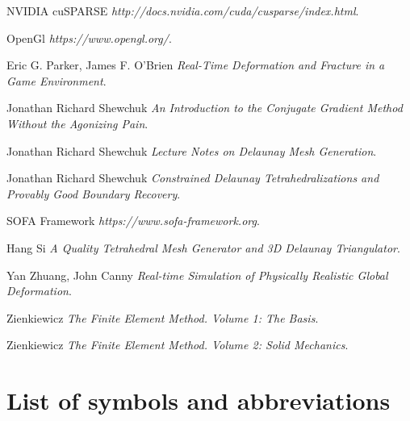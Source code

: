 \documentclass[en]{minipw} %
\begin{document}
\begin{thebibliography}{25}
 NVIDIA cuSPARSE \emph{http://docs.nvidia.com/cuda/cusparse/index.html}.

 OpenGl \emph{https://www.opengl.org/}.

 Eric G. Parker, James F. O'Brien \emph{Real-Time Deformation and Fracture in a Game Environment}.

 Jonathan Richard Shewchuk \emph{An Introduction to the Conjugate Gradient Method Without the Agonizing Pain}.

 Jonathan Richard Shewchuk \emph{Lecture Notes on Delaunay Mesh Generation}.

 Jonathan Richard Shewchuk \emph{Constrained Delaunay Tetrahedralizations and Provably Good Boundary Recovery}.

 SOFA Framework \emph{https://www.sofa-framework.org}.

 Hang Si \emph{A Quality Tetrahedral Mesh Generator and 3D Delaunay Triangulator}.

 Yan Zhuang, John Canny \emph{Real-time Simulation of Physically Realistic Global Deformation}.

 Zienkiewicz \emph{The Finite Element Method. Volume 1: The Basis}.

 Zienkiewicz \emph{The Finite Element Method. Volume 2: Solid Mechanics}.
































\end{thebibliography}

\chapter*{List of symbols and abbreviations}
\end{document}
